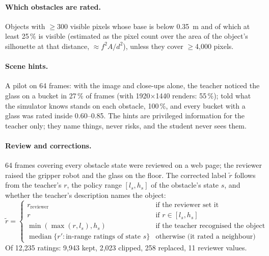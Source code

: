 \documentclass[10pt,a4paper]{article}
\begin{document}
\paragraph{Which obstacles are rated.} Objects with $\geq$300 visible pixels whose base is below 0.35~m and of which at least
25\,\% is visible (estimated as the pixel count over the area of the object's silhouette at that distance,
$\approx f^2 A/d^2$), unless they cover $\geq$4{,}000 pixels.

\paragraph{Scene hints.} A pilot on 64 frames: with the image and close-ups alone, the teacher noticed the glass on a bucket in
27\,\% of frames (with 1920$\times$1440 renders: 55\,\%); told what the simulator knows stands on each obstacle, 100\,\%, and every
bucket with a glass was rated inside 0.60--0.85. The hints are privileged information for the teacher only; they name things,
never risks, and the student never sees them.

\paragraph{Review and corrections.} 64 frames covering every obstacle state were reviewed on a web page; the reviewer raised the
gripper robot and the glass on the floor. The corrected label $\tilde r$ follows from the teacher's $r$, the policy range $[l_s,h_s]$
of the obstacle's state $s$, and whether the teacher's description names the object:
\begin{equation}
\tilde r = \begin{cases}
r_{\text{reviewer}} & \text{if the reviewer set it}\\
r & \text{if } r\in[l_s,h_s]\\
\min(\max(r,l_s),h_s) & \text{if the teacher recognised the object}\\
\operatorname{median}\{r' : \text{in-range ratings of state } s\} & \text{otherwise (it rated a neighbour)}
\end{cases}
\end{equation}
Of 12{,}235 ratings: 9{,}943 kept, 2{,}023 clipped, 258 replaced, 11 reviewer values.
\end{document}
